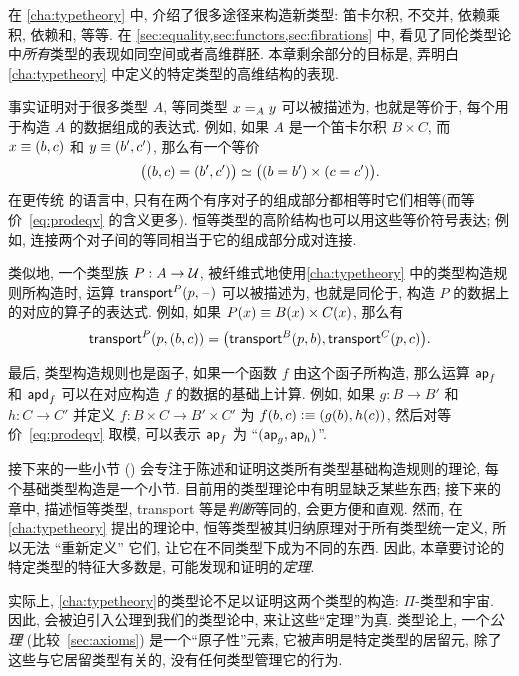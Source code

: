 在 \cref{cha:typetheory} 中, 介绍了很多途径来构造新类型: 笛卡尔积, 不交并, 依赖乘积, 依赖和, 等等.
在 \cref{sec:equality,sec:functors,sec:fibrations} 中, 看见了同伦类型论中\emph{所有}类型的表现如同空间或者高维群胚.
本章剩余部分的目标是, 弄明白 \cref{cha:typetheory} 中定义的特定类型的高维结构的表现.

事实证明对于很多类型 $A$, 等同类型 $\id[A]xy$ 可以被描述为, 也就是等价于, 每个用于构造 $A$ 的数据组成的表达式.
例如, 如果 $A$ 是一个笛卡尔积 $B\times C$, 而 $x\jdeq (b,c)$ 和 $y\jdeq(b',c')$, 那么有一个等价
\begin{equation}\label{eq:prodeqv}
  \eqv{\big((b,c)=(b',c')\big)}{\big((b=b')\times (c=c')\big)}.
\end{equation}
在更传统 的语言中, 只有在两个有序对子的组成部分都相等时它们相等(而等价~\eqref{eq:prodeqv} 的含义更多).
恒等类型的高阶结构也可以用这些等价符号表达;
例如, 连接两个对子间的等同相当于它的组成部分成对连接.

类似地, 一个类型族 $P:A\to\type$, 被纤维式地使用\cref{cha:typetheory} 中的类型构造规则所构造时, 运算 $\transfib{P}{p}{\blank}$ 可以被描述为, 也就是同伦于, 构造 $P$ 的数据上的对应的算子的表达式.
例如, 如果 $P(x) \jdeq B(x)\times C(x)$, 那么有
\[\transfib{P}{p}{(b,c)} = \big(\transfib{B}{p}{b},\transfib{C}{p}{c}\big).\]

最后, 类型构造规则也是函子, 如果一个函数 $f$ 由这个函子所构造, 那么运算 $\apfunc f$ 和 $\apdfunc f$ 可以在对应构造 $f$ 的数据的基础上计算.
例如, 如果 $g:B\to B'$ 和 $h:C\to C'$ 并定义 $f:B\times C \to B'\times C'$ 为 $f(b,c)\defeq (g(b),h(c))$, 然后对等价~\eqref{eq:prodeqv} 取模, 可以表示 $\apfunc f$ 为 ``$(\apfunc g,\apfunc h)$''.

接下来的一些小节 () 会专注于陈述和证明这类所有类型基础构造规则的理论, 每个基础类型构造是一个小节.
目前用的类型理论中有明显缺乏某些东西;
接下来的章中, 描述恒等类型, transport 等是\emph{判断}等同的, 会更方便和直观.
然而, 在 \cref{cha:typetheory} 提出的理论中, 恒等类型被其归纳原理对于所有类型统一定义, 所以无法 ``重新定义'' 它们, 让它在不同类型下成为不同的东西.
因此, 本章要讨论的特定类型的特征大多数是, 可能发现和证明的\emph{定理}.

实际上, \cref{cha:typetheory}的类型论不足以证明这两个类型的构造: $\Pi$-类型和宇宙.
因此, 会被迫引入公理到我们的类型论中, 来让这些``定理''为真.
类型论上, 一个\emph{公理} (比较~\cref{sec:axioms}) 是一个``原子性''元素, 它被声明是特定类型的居留元, 除了这些与它居留类型有关的, 没有任何类型管理它的行为.
%

